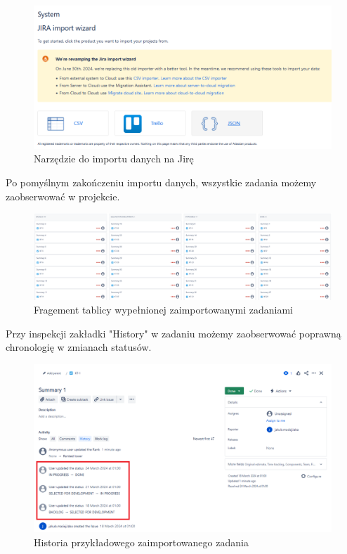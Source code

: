 \begin{figure}[H]
    \centering
    \includegraphics[width=15cm,keepaspectratio]{rysunki/jira-import-wizard.png}
    \caption{Narzędzie do importu danych na Jirę}
\end{figure}

Po pomyślnym zakończeniu importu danych, wszystkie zadania możemy zaobserwować w projekcie.
\begin{figure}[H]
    \centering
    \includegraphics[width=15cm,keepaspectratio]{rysunki/jira-board.png}
    \caption{Fragement tablicy wypełnionej zaimportowanymi zadaniami}
\end{figure}

Przy inspekcji zakładki "History" w zadaniu możemy zaobserwować poprawną chronologię w zmianach statusów.
\begin{figure}[H]
    \centering
    \includegraphics[width=15cm,keepaspectratio]{rysunki/jira-issue-history.png}
    \caption{Historia przykładowego zaimportowanego zadania}
\end{figure}


